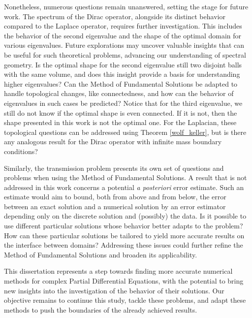 Nonetheless, numerous questions remain unanswered, setting the stage for future work. The spectrum of the Dirac operator, alongside its distinct behavior compared to the Laplace operator, requires further investigation. This includes the behavior of the second eigenvalue and the shape of the optimal domain for various eigenvalues. Future explorations may uncover valuable insights that can be useful for such theoretical problems, advancing our understanding of spectral geometry. Is the optimal shape for the second eigenvalue still two disjoint balls with the same volume, and does this insight provide a basis for understanding higher eigenvalues? Can the Method of Fundamental Solutions be adapted to handle topological changes, like connectedness, and how can the behavior of eigenvalues in such cases be predicted? Notice that for the third eigenvalue, we still do not know if the optimal shape is even connected. If it is not, then the shape presented in this work is not the optimal one. For the Laplacian, these topological questions can be addressed using Theorem \ref{wolf_keller}, but is there any analogous result for the Dirac operator with infinite mass boundary conditions?

Similarly, the transmission problem presents its own set of questions and problems when using the Method of Fundamental Solutions. A result that is not addressed in this work concerns a potential \textit{a posteriori} error estimate. Such an estimate would aim to bound, both from above and from below, the error between an exact solution and a numerical solution by an error estimator depending only on the discrete solution and (possibly) the data. Is it possible to use different particular solutions whose behavior better adapts to the problem? How can these particular solutions be tailored to yield more accurate results on the interface between domains? Addressing these issues could further refine the Method of Fundamental Solutions and broaden its applicability. 

This dissertation represents a step towards finding more accurate numerical methods for complex Partial Differential Equations, with the potential to bring new insights into the investigation of the behavior of their solutions. Our objective remains to continue this study, tackle these problems, and adapt these methods to push the boundaries of the already achieved results. 